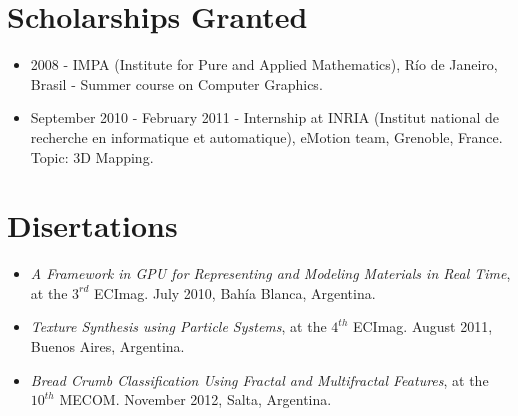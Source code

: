 \documentclass[a4paper,12pt]{article}
\begin{document}
\section*{Scholarships Granted}

\begin{itemize}
\item 2008 - IMPA (Institute for Pure and Applied Mathematics), R\'io de Janeiro, Brasil - Summer course on Computer Graphics.
\item September 2010 - February 2011 - Internship at INRIA (Institut national de recherche en informatique et automatique), eMotion team, Grenoble, France. Topic: 3D Mapping.
\end{itemize}

\section*{Disertations}
\begin{itemize}
\item {\it A Framework in GPU for Representing and Modeling Materials in Real Time}, at the $3^{rd}$ ECImag. July 2010, Bahía Blanca, Argentina.
\item {\it Texture Synthesis using Particle Systems}, at the $4^{th}$ ECImag. August 2011, Buenos Aires, Argentina.
\item {\it Bread Crumb Classification Using Fractal and Multifractal Features}, at the $10^{th}$ MECOM. November 2012, Salta, Argentina.
\end{itemize}
\end{document}
